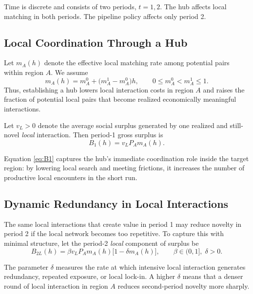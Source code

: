 Time is discrete and consists of two periods, $t=1,2$. The hub affects local matching in both periods. The pipeline policy affects only period 2.

\subsection{Local Coordination Through a Hub}

Let $m_A(h)$ denote the effective local matching rate among potential pairs within region $A$. We assume
\begin{equation}
m_A(h) = m_A^0 + \bigl(m_A^1-m_A^0\bigr)h,
\qquad
0 \le m_A^0 < m_A^1 \le 1.
\label{eq:matching_rate}
\end{equation}
Thus, establishing a hub lowers local interaction costs in region $A$ and raises the fraction of potential local pairs that become realized economically meaningful interactions.

Let $v_L>0$ denote the average social surplus generated by one realized and still-novel \emph{local} interaction. Then period-1 gross surplus is
\begin{equation}
B_1(h) = v_L P_A m_A(h).
\label{eq:B1}
\end{equation}

Equation \eqref{eq:B1} captures the hub's immediate coordination role inside the target region: by lowering local search and meeting frictions, it increases the number of productive local encounters in the short run.

\subsection{Dynamic Redundancy in Local Interactions}

The same local interactions that create value in period 1 may reduce novelty in period 2 if the local network becomes too repetitive. To capture this with minimal structure, let the period-2 \emph{local} component of surplus be
\begin{equation}
B_{2L}(h)
=
\beta v_L P_A m_A(h)\bigl[1-\delta m_A(h)\bigr],
\qquad
\beta\in(0,1],\; \delta>0.
\label{eq:B2_local}
\end{equation}

The parameter $\delta$ measures the rate at which intensive local interaction generates redundancy, repeated exposure, or local lock-in. A higher $\delta$ means that a denser round of local interaction in region $A$ reduces second-period novelty more sharply.

